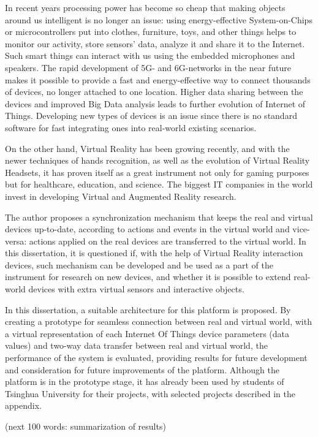 \begin{abstract*}

  In recent years processing power has become so cheap that making objects around us intelligent is no longer an issue: using energy-effective System-on-Chips or microcontrollers put into clothes, furniture, toys, and other things helps to monitor our activity, store sensors' data, analyze it and share it to the Internet. Such smart things can interact with us using the embedded microphones and speakers. The rapid development of 5G- and 6G-networks in the near future makes it possible to provide a fast and energy-effective way to connect thousands of devices, no longer attached to one location. Higher data sharing between the devices and improved Big Data analysis leads to further evolution of Internet of Things. Developing new types of devices is an issue since there is no standard software for fast integrating ones into real-world existing scenarios.
   
  On the other hand, Virtual Reality has been growing recently, and with the newer techniques of hands recognition, as well as the evolution of Virtual Reality Headsets, it has proven itself as a great instrument not only for gaming purposes but for healthcare, education, and science. The biggest IT companies in the world invest in developing Virtual and Augmented Reality research.
   
  The author proposes a synchronization mechanism that keeps the real and virtual devices up-to-date, according to actions and events in the virtual world and vice-versa: actions applied on the real devices are transferred to the virtual world. In this dissertation, it is questioned if, with the help of Virtual Reality interaction devices, such mechanism can be developed and be used as a part of the instrument for research on new devices, and whether it is possible to extend real-world devices with extra virtual sensors and interactive objects.
  
  In this dissertation, a suitable architecture for this platform is proposed. By creating a prototype for seamless connection between real and virtual world, with a virtual representation of each Internet Of Things device parameters (data values) and two-way data transfer between real and virtual world, the performance of the system is evaluated, providing results for future development and consideration for future improvements of the platform. Although the platform is in the prototype stage, it has already been used by students of Tsinghua University for their projects, with selected projects described in the appendix. 
  
  (next 100 words: summarization of results)
 


\end{abstract*}
